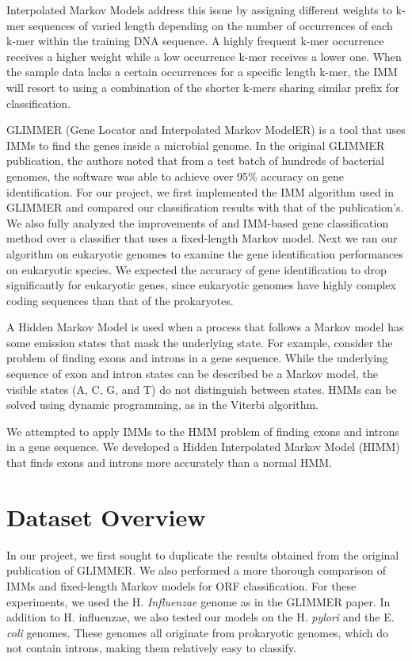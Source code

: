 \documentclass[11pt,letterpaper]{article}
\begin{document}
Interpolated Markov Models address this issue by assigning different weights to k-mer sequences of varied length depending on the number of occurrences of each k-mer within the training DNA sequence. A highly frequent k-mer occurrence receives a higher weight while a low occurrence k-mer receives a lower one. When the sample data lacks a certain occurrences for a specific length k-mer, the IMM will resort to using a combination of the shorter k-mers sharing similar prefix for classification.

GLIMMER (Gene Locator and Interpolated Markov ModelER) is a tool that uses IMMs to find the genes inside a microbial genome. In the original GLIMMER publication, the authors noted that from a test batch of hundreds of bacterial genomes, the software was able to achieve over 95\% accuracy on gene identification. For our project, we first implemented the IMM algorithm used in GLIMMER and compared our classification results with that of the publication's. We also fully analyzed the improvements of and IMM-based gene classification method over a classifier that uses a fixed-length Markov model. Next we ran our algorithm on eukaryotic genomes to examine the gene identification performances on eukaryotic species. We expected the accuracy of gene identification to drop significantly for eukaryotic genes, since eukaryotic genomes have highly complex coding sequences than that of the prokaryotes.

A Hidden Markov Model is used when a process that follows a Markov model has some emission states that mask the underlying state. For example, consider the problem of finding exons and introns in a gene sequence. While the underlying sequence of exon and intron states can be described be a Markov model, the visible states (A, C, G, and T) do not distinguish between states. HMMs can be solved using dynamic programming, as in the Viterbi algorithm.

We attempted to apply IMMs to the HMM problem of finding exons and introns in a gene sequence. We developed a Hidden Interpolated Markov Model (HIMM) that finds exons and introns more accurately than a normal HMM.


\section{Dataset Overview}

In our project, we first sought to duplicate the results obtained from the original publication of GLIMMER. We also performed a more thorough comparison of IMMs and fixed-length Markov models for ORF classification. For these experiments, we used the H. \emph{Influenzae} genome as in the GLIMMER paper. In addition to H. influenzae, we also tested our models on the H. \emph{pylori} and the E. \emph{coli} genomes. These genomes all originate from prokaryotic genomes, which do not contain introns, making them relatively easy to classify.
\end{document}
